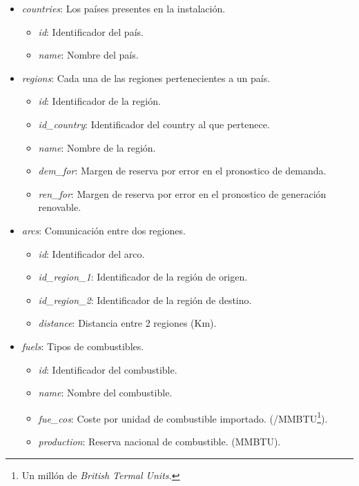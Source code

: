 \label{title:DiccionarioDatos}
\begin{itemize}
	
	\item \textit{countries}: Los países presentes en la instalación.
	\begin{itemize}
		\item \textit{id}: Identificador del país.		
		\item \textit{name}: Nombre del país.
	\end{itemize}
	
	\item \textit{regions}: Cada una de las regiones pertenecientes a un país.
	\begin{itemize}
		\item \textit{id}: Identificador de la región.		
		\item \textit{id\_country}: Identificador del country al que pertenece.
		\item \textit{name}: Nombre de la región.
		\item \textit{dem\_for}: Margen de reserva por error en el pronostico de demanda.
		\item \textit{ren\_for}: Margen de reserva por error en el pronostico de generación renovable.
	\end{itemize}

	\item \textit{arcs}: Comunicación entre dos regiones.
	\begin{itemize}
		\item \textit{id}: Identificador del arco.		
		\item \textit{id\_region\_1}: Identificador de la región de origen.
		\item \textit{id\_region\_2}: Identificador de la región de destino.
		\item \textit{distance}: Distancia entre 2 regiones (Km).
	\end{itemize}
	
	\item \textit{fuels}: Tipos de combustibles.
	\begin{itemize}
		\item \textit{id}: Identificador del combustible.		
		\item \textit{name}: Nombre del combustible.
		\item \textit{fue\_cos}: Coste por unidad de combustible importado. (\textdollar/MMBTU\footnote{Un millón de \textit{British Termal Units.}}).
		\item \textit{production}: Reserva nacional de combustible. (MMBTU).
	\end{itemize}
	

\end{itemize}

